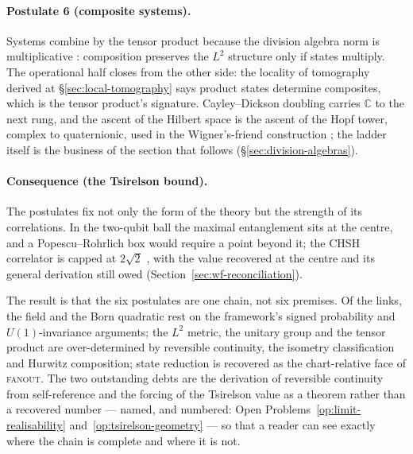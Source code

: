 \paragraph{Postulate 6 (composite systems).}
Systems combine by the tensor product because the division algebra norm is
multiplicative \autocite{hurwitz1898composition}: composition preserves the $L^{2}$ structure
only if states multiply. The operational half closes from the other side: the locality of
tomography derived at \S\ref{sec:local-tomography} says product states determine composites,
which is the tensor product's signature. Cayley--Dickson doubling carries $\mathbb{C}$ to the next
rung, and the ascent of the Hilbert space is the ascent of the Hopf tower, complex
to quaternionic, used in the Wigner's-friend construction
\autocite{mosseri2001hopf}; the ladder itself is the business of the section that follows
(\S\ref{sec:division-algebras}).

\paragraph{Consequence (the Tsirelson bound).}
The postulates fix not only the form of the theory but the strength of its
correlations. In the two-qubit ball the maximal entanglement sits at the centre,
and a Popescu--Rohrlich box \autocite{PopescuRohrlich1994} would require a point
beyond it; the CHSH correlator is capped at $2\sqrt{2}$
\autocite{Cirelson1980QuantumInequality, VerstraeteWolf2002, Held2021}, with the value recovered
at the centre and its general derivation still owed
(Section~\ref{sec:wf-reconciliation}).

\medskip
\noindent The result is that the six postulates are one chain, not six premises.
Of the links, the field and the Born quadratic rest on the framework's signed
probability and $U(1)$-invariance arguments; the $L^{2}$ metric, the unitary group
and the tensor product are over-determined by reversible continuity, the isometry
classification and Hurwitz composition; state reduction is recovered as the
chart-relative face of \textsc{fanout}. The two outstanding debts are the
derivation of reversible continuity from self-reference and the forcing of the Tsirelson value as
a theorem rather than a recovered number --- named, and numbered:
Open Problems~\ref{op:limit-realisability} and~\ref{op:tsirelson-geometry} --- so that a reader
can see exactly where the chain is complete and where it is not.

